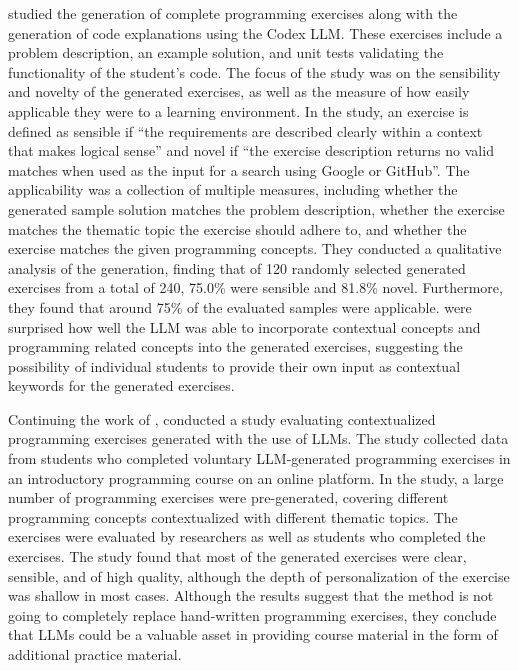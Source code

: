 \documentclass[english, 12pt, a4paper, sci, utf8, a-2b, online]{latex/definitions/aaltothesis}
\begin{document}
\textcite{10.1145/3501385.3543957} studied the generation of complete programming exercises along with the generation of code explanations using the Codex LLM. These exercises include a problem description, an example solution, and unit tests validating the functionality of the student's code. The focus of the study was on the sensibility and novelty of the generated exercises, as well as the measure of how easily applicable they were to a learning environment. In the study, an exercise is defined as sensible if ``the requirements are described clearly within a context that makes logical sense'' and novel if  ``the exercise description returns no valid matches when used as the input for a search using Google or GitHub''. The applicability was a collection of multiple measures, including whether the generated sample solution matches the problem description, whether the exercise matches the thematic topic the exercise should adhere to, and whether the exercise matches the given programming concepts. They conducted a qualitative analysis of the generation, finding that of 120 randomly selected generated exercises from a total of 240, 75.0\% were sensible and 81.8\% novel. Furthermore, they found that around 75\% of the evaluated samples were applicable. \textcite{10.1145/3501385.3543957} were surprised how well the LLM was able to incorporate contextual concepts and programming related concepts into the generated exercises, suggesting the possibility of individual students to provide their own input as contextual keywords for the generated exercises.

Continuing the work of \textcite{10.1145/3501385.3543957}, \textcite{10.1145/3632620.3671103} conducted a study evaluating contextualized programming exercises generated with the use of LLMs. The study collected data from students who completed voluntary LLM-generated programming exercises in an introductory programming course on an online platform. In the study, a large number of programming exercises were pre-generated, covering different programming concepts contextualized with different thematic topics. The exercises were evaluated by researchers as well as students who completed the exercises. The study found that most of the generated exercises were clear, sensible, and of high quality, although the depth of personalization of the exercise was shallow in most cases. Although the results suggest that the method is not going to completely replace hand-written programming exercises, they conclude that LLMs could be a valuable asset in providing course material in the form of additional practice material.
\end{document}
